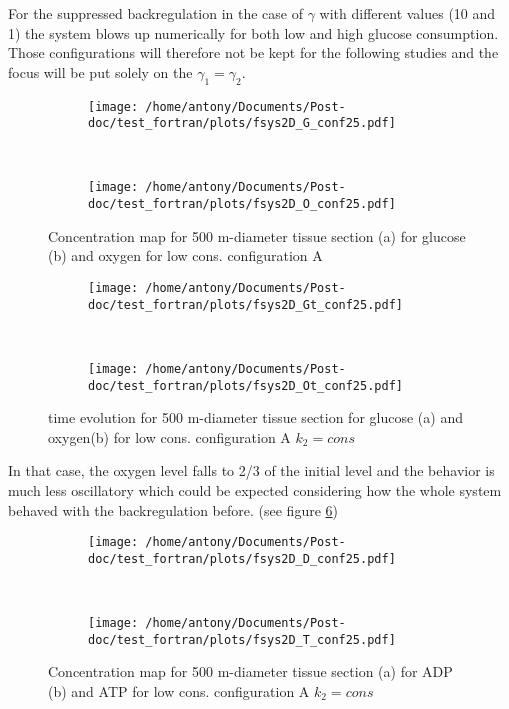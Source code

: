 \documentclass[11pt,a4paper]{article}
\begin{document}
For the suppressed backregulation in the case of $\gamma$ with different values (10 and 1) the system  blows up numerically for both low and high glucose consumption. Those configurations will therefore not be kept for the following studies and the focus will be put solely on the $\gamma_1 = \gamma_2$.

\begin{figure}[ht!]
	\begin{subfigure}{0.45\textwidth}
	\centering
	\texttt{[image: /home/antony/Documents/Post-doc/test\_fortran/plots/fsys2D\_G\_conf25.pdf]}
	\caption{ \label{G_conf25}}
	\end{subfigure}
	~~
	\begin{subfigure}{0.45\textwidth}
	\texttt{[image: /home/antony/Documents/Post-doc/test\_fortran/plots/fsys2D\_O\_conf25.pdf]}
		\caption{ \label{O_conf25}}
	\end{subfigure}
	\caption{Concentration map for 500 \textmu m-diameter tissue section  (a) for glucose (b) and oxygen \label{conf25} for low cons. configuration A}
\end{figure} 

\begin{figure}[ht!]
	\begin{subfigure}{0.45\textwidth}
	\centering
	\texttt{[image: /home/antony/Documents/Post-doc/test\_fortran/plots/fsys2D\_Gt\_conf25.pdf]}
	\caption{ \label{Gt_conf25}}
	\end{subfigure}
	~~
	\begin{subfigure}{0.45\textwidth}
	\texttt{[image: /home/antony/Documents/Post-doc/test\_fortran/plots/fsys2D\_Ot\_conf25.pdf]}
		\caption{ \label{Ot_conf25}}
	\end{subfigure}
	\caption{time evolution for 500 \textmu m-diameter tissue section  for glucose (a) and oxygen(b) for low cons. configuration A $k_2 = cons$ \label{tconf25}}
\end{figure}

In that case, the oxygen level falls to 2/3 of the initial level and the behavior is much less oscillatory which could be expected considering how the whole system behaved with the backregulation before. (see figure \ref{tconf25})

\begin{figure}[ht!]
	\begin{subfigure}{0.45\textwidth}
	\centering
	\texttt{[image: /home/antony/Documents/Post-doc/test\_fortran/plots/fsys2D\_D\_conf25.pdf]}
	\caption{ \label{D_conf25}}
	\end{subfigure}
	~~
	\begin{subfigure}{0.45\textwidth}
	\texttt{[image: /home/antony/Documents/Post-doc/test\_fortran/plots/fsys2D\_T\_conf25.pdf]}
		\caption{ \label{T_conf25}}
	\end{subfigure}
	\caption{Concentration map for 500 \textmu m-diameter tissue section  (a) for ADP (b) and ATP \label{conf25} for low cons. configuration A $k_2 = cons$}
\end{figure} 
\end{document}
